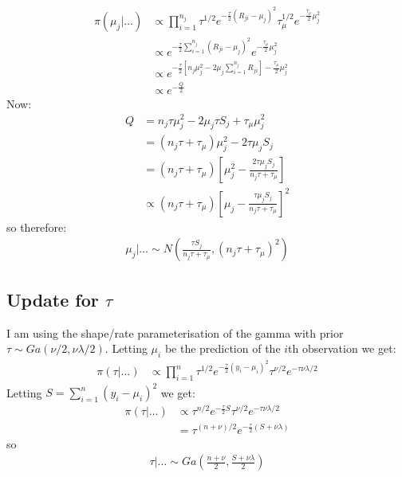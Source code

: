 \documentclass{article}
\begin{document}
\begin{align*}
\pi(\mu_{j}|\ldots)  &\propto \prod_{i=1}^{n_j}  \tau^{1/2} e^{-\frac{\tau}{2} (R_{ji} - \mu_{j})^2} \tau_{\mu}^{1/2} e^{-\frac{\tau_\mu}{2} \mu_{j}^2 }\\
&\propto e^{-\frac{\tau}{2} \sum_{i=1}^{n_j} (R_{ji} - \mu_{j})^2} e^{-\frac{\tau_\mu}{2} \mu_{j}^2 } \\ 
&\propto e^{-\frac{\tau}{2} \left[ n_j \mu_{j}^2 - 2 \mu_j  \sum_{i=1}^{n_j} R_{ji} \right] - \frac{\tau_\mu}{2} \mu_j^2}\\
&\propto e^{-\frac{Q}{2}}
\end{align*}
Now:
\begin{align*}
Q &= n_j \tau \mu_j^2 - 2\mu_j \tau S_j + \tau_\mu \mu_j^2\\
&= (n_j \tau + \tau_\mu) \mu_j^2 - 2 \tau \mu_j S_j \\
&= (n_j \tau + \tau_\mu) \left[ \mu_j^2 - \frac{2 \tau \mu_j S_j}{n_j \tau + \tau_\mu} \right] \\
&\propto (n_j \tau + \tau_\mu) \left[ \mu_j - \frac{\tau \mu_j S_j}{n_j \tau + \tau_\mu} \right]^2
\end{align*}
so therefore:
\begin{align*}
\mu_j| \ldots \sim N \left( \frac{\tau S_j}{n_j \tau + \tau_\mu} , (n_j \tau + \tau_\mu)^2 \right)
\end{align*}

\subsection*{Update for $\tau$}

I am using the shape/rate parameterisation of the gamma with prior $\tau \sim Ga(\nu/2, \nu \lambda / 2)$. Letting $\mu_i$ be the prediction of the $i$th observation we get:
\begin{align*}
\pi(\tau | \ldots) &\propto \prod_{i=1}^n \tau^{1/2} e^{-\frac{\tau}{2} (y_i - \mu_i)^2} \tau^{\nu/2} e^{-\tau \nu \lambda / 2}
\end{align*}
Letting $S = \sum_{i=1}^n (y_i - \mu_i)^2$ we get:
\begin{align*}
\pi(\tau | \ldots) &\propto \tau^{n/2} e^{-\frac{\tau}{2} S} \tau^{\nu/2} e^{-\tau \nu \lambda / 2}\\
&= \tau^{(n + \nu)/2} e^{-\frac{\tau}{2} (S + \nu \lambda)}
\end{align*}
so
\begin{align*}
\tau | \ldots \sim Ga \left( \frac{n + \nu}{2}, \frac{S + \nu \lambda}{2} \right)
\end{align*}
\end{document}
